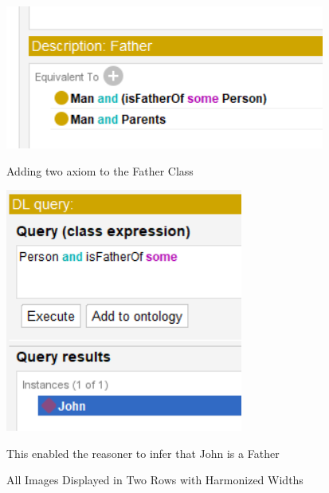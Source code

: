 \begin{figure}[h!]
    \begin{minipage}[b]{0.5\textwidth}
        \centering
        \includegraphics[width=\textwidth]{images/1.1 - tuto/q4 - adding an axiom to father .png}
        \caption{Adding two axiom to the Father Class}
        \label{fig:image4}
    \end{minipage}
    \hfill
    \begin{minipage}[b]{0.3\textwidth}
        \centering
        \includegraphics[width=\textwidth]{images/1.1 - tuto/q5 - now q3 works .png}
        \caption{This enabled the reasoner to infer that John is a Father}
        \label{fig:image5}
    \end{minipage}
    \caption{All Images Displayed in Two Rows with Harmonized Widths}
    \label{fig:allimages}
\end{figure}